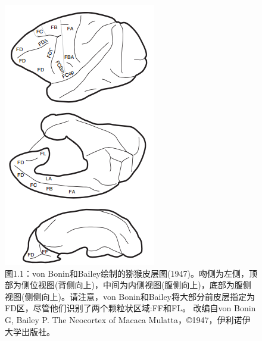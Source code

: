 \begin{figure}[!htb]
	\centering
	\includegraphics[width=0.5\linewidth]{image_pfc/Fig_1_1}
	\caption{图1.1：von Bonin和Bailey绘制的猕猴皮层图(1947)。吻侧为左侧，顶部为侧位视图(背侧向上)，中间为内侧视图(腹侧向上)，底部为腹侧视图(侧侧向上)。请注意，von Bonin和Bailey将大部分前皮层指定为FD区，尽管他们识别了两个颗粒状区域:FF和FL。
		改编自von Bonin G, Bailey P. The Neocortex of Macaca Mulatta，©1947，伊利诺伊大学出版社。\label{fig:fig_1_1}}
\end{figure}

